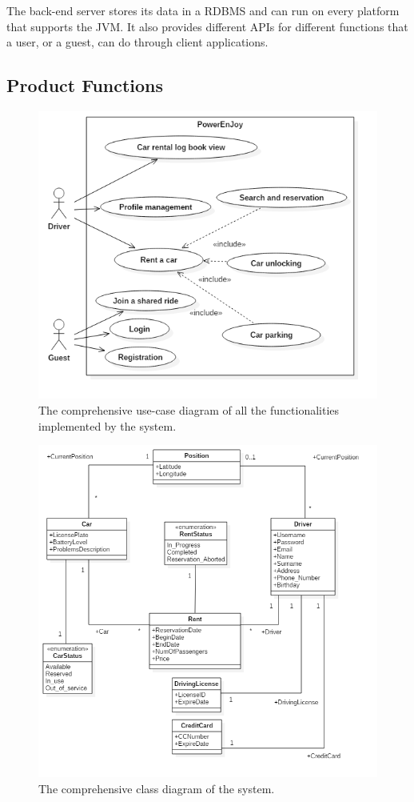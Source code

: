 The back-end server stores its data in a RDBMS and can run on every platform that supports the JVM. It also provides different APIs for different functions that a user, or a guest, can do through client applications. 

\subsection{Product Functions}
\begin{figure}[H]
	\centering
	\includegraphics[width=\textwidth]{use_cases/PowerEnJoy.jpg}
	\caption{The comprehensive use-case diagram of all the functionalities implemented by the system.}
\end{figure}

\begin{figure}[H]
	\centering
	\includegraphics[width=\textwidth]{uml/PowerEnJoy.jpg}
	\caption{The comprehensive class diagram of the system.}
\end{figure}

